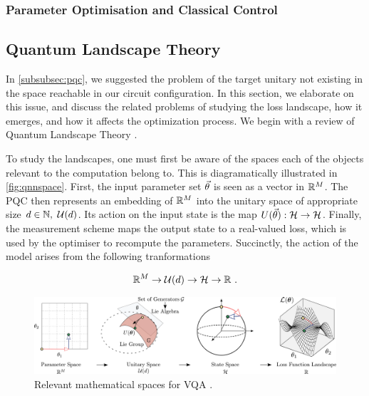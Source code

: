 \subsubsection{Parameter Optimisation and Classical Control}

\subsection{Quantum Landscape Theory}
\label{subsec:quantlandscape}

In \autoref{subsubsec:pqc}, we suggested the problem of the target unitary not
existing in the space reachable in our circuit configuration. In this section,
we elaborate on this issue, and discuss the related problems of studying the
loss landscape, how it emerges, and how it affects the optimization process. We
begin with a review of Quantum Landscape Theory \cite[see][chapter
II.B]{larocca2021theory}.

To study the landscapes, one must first be aware of the spaces each of the
objects relevant to the computation belong to. This is diagramatically
illustrated in \autoref{fig:qnnspace}. First, the input parameter set
\(\vec{\theta}\) is seen as a vector in \(\mathbb{R}^M\). The PQC then represents an
embedding of \(\mathbb{R}^M\) into the unitary space of appropriate size
\(d\in\mathbb{N},~ \mathcal{U}(d)\). Its action on the input state is the map
\(U(\vec{\theta}): \mathcal{H} \to \mathcal{H}\). Finally, the measurement
scheme maps the output state to a real-valued loss, which is used by the
optimiser to recompute the parameters. Succinctly, the action of the model
arises from the following tranformations

\begin{gather}
    \mathbb{R}^M \to \mathcal{U}(d) \to \mathcal{H} \to \mathbb{R}~.
    \label{eq:transformations}
\end{gather}

\begin{figure}[!ht]
    \includegraphics[width=\textwidth]{figures/mapsurjective.pdf}
    \caption{Relevant mathematical spaces for VQA \cite[taken from][Figure
            2]{larocca2021theory}.}
    \label{fig:qnnspace}
\end{figure}

